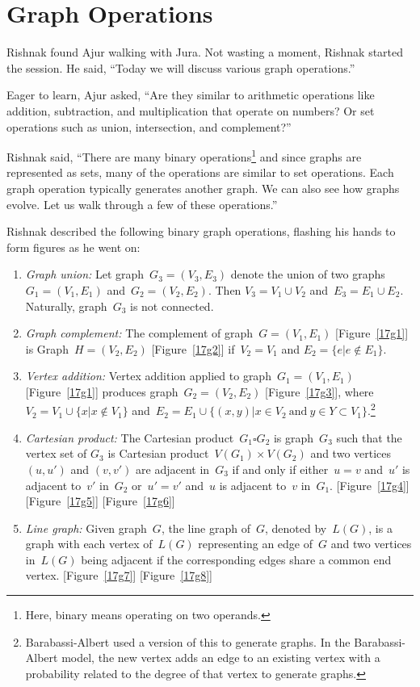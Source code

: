\chapter{Graph Operations}

Rishnak found Ajur walking with Jura. Not wasting a moment, Rishnak started the session. He said, ``Today we will discuss various graph operations.''

Eager to learn, Ajur asked, ``Are they similar to arithmetic operations like addition, subtraction, and multiplication that operate on numbers? Or set operations such as union, intersection, and complement?''

Rishnak said, ``There are many binary operations\footnote{Here, binary means operating on two operands.} and since graphs are represented as sets, many of the operations are similar to set operations. Each graph operation typically generates another graph. We can also see how graphs evolve. Let us walk through a few of these operations.''

Rishnak described the following binary graph operations, flashing his hands to form figures as he went on:
\begin{enumerate}
    \item \textit{Graph union:} Let graph~$G_3=(V_3,E_3)$ denote the union of two graphs~$G_1=(V_1,E_1)$ and~$G_2=(V_2,E_2)$. Then $V_3=V_1\cup V_2$ and~$E_3=E_1\cup E_2$. Naturally, graph~$G_3$ is not connected.
    \item \textit{Graph complement:} The complement of graph~$G=(V_1,E_1)$ [Figure~\ref{17g1}] is Graph~$H=(V_2,E_2)$ [Figure~\ref{17g2}] if~$V_2=V_1$ and $E_2=\{e|e\notin E_1\}$.
    \item \textit{Vertex addition:} Vertex addition applied to graph~$G_1=(V_1,E_1)$ [Figure~\ref{17g1}] produces graph~$G_2=(V_2,E_2)$ [Figure~\ref{17g3}], where $V_2=V_1\cup\{x|x\notin V_1\}$ and~$E_2=E_1\cup\{(x,y)|x\in V_2\ \text{and}\ y\in Y\subset V_1\}$.\footnote{Barabassi-Albert used a version of this to generate graphs. In the Barabassi-Albert model, the new vertex adds an edge to an existing vertex with a probability related to the degree of that vertex to generate graphs.}
    \item  \textit{Cartesian product:} The Cartesian product~$G_1\square G_2$ is graph~$G_3$ such that the vertex set of $G_3$ is Cartesian product~$V(G_1)\times V(G_2)$ and two vertices~$(u,u')$ and $(v,v')$ are adjacent in~$G_3$ if and only if either~$u=v$ and~$u'$ is adjacent to~$v'$ in~$G_2$ or~$u'=v'$ and~$u$ is adjacent to~$v$ in~$G_1$. [Figure~\ref{17g4}] [Figure~\ref{17g5}] [Figure~\ref{17g6}]
    \item \textit{Line graph:} Given graph~$G$, the line graph of~$G$, denoted by~$L(G)$, is a graph with each vertex of~$L(G)$ representing an edge of~$G$ and two vertices in~$L(G)$ being adjacent if the corresponding edges share a common end vertex. [Figure~\ref{17g7}] [Figure~\ref{17g8}]
\end{enumerate}

